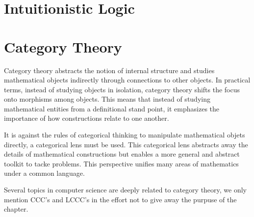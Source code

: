 \documentclass[12pt]{book}
\begin{document}
\chapter{Intuitionistic Logic}
\newpage


\chapter{Category Theory}

Category theory abstracts the notion of internal structure and studies mathematical objects indirectly through connections to other objects. In practical terms, instead of studying objects in isolation, category theory shifts the focus onto morphisms among objects. This means that instead of studying mathematical entities from a definitional stand point, it emphasizes the importance of how constructions relate to one another.

It is against the rules of categorical thinking to manipulate mathematical objets directly, a categorical lens must be used. This categorical lens abstracts away the details of mathematical constructions but enables a more general and abstract toolkit to tacke problems. This perspective unifies many areas of mathematics under a common language.

Several topics in computer science are deeply related to category theory, we only mention CCC's and LCCC's in the effort not to give away the purpuse of the chapter.


\end{document}
